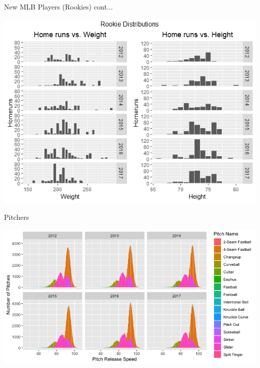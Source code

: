 \documentclass[14pt]{bredelebeamer}
\begin{document}
\begin{frame}{New MLB Players (Rookies) cont...}
	\begin{center}
    	\includegraphics[scale = 0.6, trim=0 0 0 0]{Graphs/rookie_no_pitch_weight_height.png}
     \end{center}
\end{frame}


\begin{frame}{Pitchers}
	\begin{center}
    	\includegraphics[scale = 0.4, trim=0 0 0 0]{Graphs/pitches.png}
     \end{center}
\end{frame}
\end{document}
